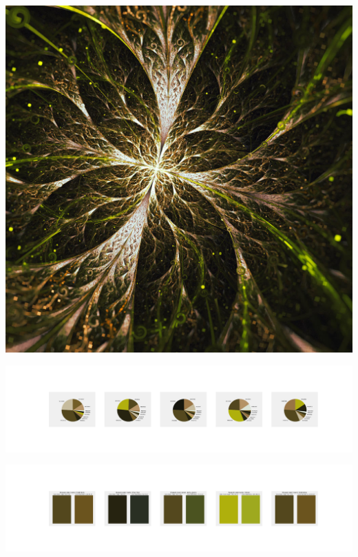 \documentclass[11pt]{article}
\begin{document}
\begin{landscape}
    \begin{center}
    \includegraphics[width=\textwidth]{./nbimg/file (440).jpg}
    \end{center}

    \begin{center}
    \includegraphics[width=250mm]{./nbimg/pie-379.jpg}
    \end{center}

    \begin{center}
    \includegraphics[width=250mm]{./nbimg/peak-379.jpg}
    \end{center}
    


\end{landscape}
\end{document}
